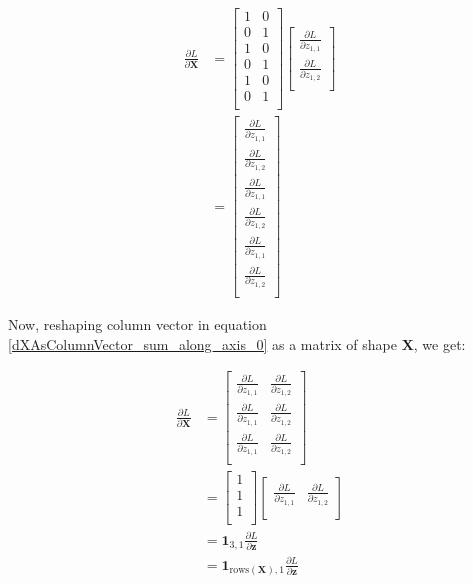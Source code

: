 \documentclass{article}
\newcommand{\vecr}[1]{\bm{#1}}
\newcommand{\matr}[1]{\mathbf{#1}} %
\begin{document}
\begin{align}
\frac{\partial L}{\partial \matr{X}} &=
\begin{bmatrix}
1 & 0 \\%
0 & 1 \\%
1 & 0 \\%
0 & 1 \\%
1 & 0 \\%
0 & 1 \\%
\end{bmatrix}
\begin{bmatrix}
\frac{\partial L}{\partial z_{1,1}} \\[0.7em]
\frac{\partial L}{\partial z_{1,2}} \\[0.7em]
\end{bmatrix}
\nonumber \\
&=
\begin{bmatrix}
\frac{\partial L}{\partial z_{1,1}} \\[0.7em]
\frac{\partial L}{\partial z_{1,2}} \\[0.7em]
\frac{\partial L}{\partial z_{1,1}} \\[0.7em]
\frac{\partial L}{\partial z_{1,2}} \\[0.7em]
\frac{\partial L}{\partial z_{1,1}} \\[0.7em]
\frac{\partial L}{\partial z_{1,2}} \\[0.7em]
\end{bmatrix} \label{dXAsColumnVector_sum_along_axis_0}
\end{align}

Now, reshaping column vector in equation \ref{dXAsColumnVector_sum_along_axis_0} as a matrix of shape $\matr{X}$, we get:

\begin{align}
\frac{\partial L}{\partial \matr{X}} &=
\begin{bmatrix}
\frac{\partial L}{\partial z_{1,1}} &
\frac{\partial L}{\partial z_{1,2}} \\[0.7em]
\frac{\partial L}{\partial z_{1,1}} &
\frac{\partial L}{\partial z_{1,2}} \\[0.7em]
\frac{\partial L}{\partial z_{1,1}} &
\frac{\partial L}{\partial z_{1,2}} \\[0.7em]
\end{bmatrix} \nonumber
\\
&=
\begin{bmatrix}
1 \\
1 \\
1 \\
\end{bmatrix}
\begin{bmatrix}
\frac{\partial L}{\partial z_{1,1}} & \frac{\partial L}{\partial z_{1,2}} \\[0.3em]
\end{bmatrix} \nonumber
\\
&=
\mathbf{1}_{3,1} \frac{\partial L}{\partial \vecr{z}} \nonumber
\\
&=
\mathbf{1}_{\text{rows}(\matr{X}),1} \frac{\partial L}{\partial \vecr{z}}
\end{align}
\end{document}

